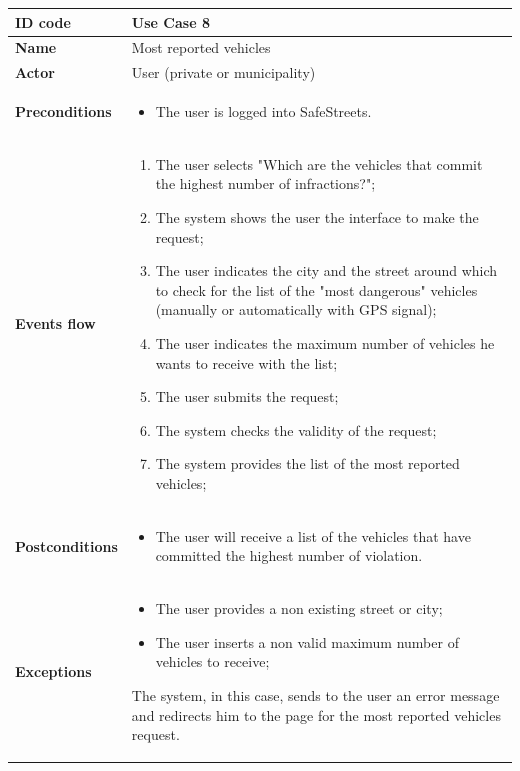 \documentclass[titlepage]{article}
\begin{document}
\newpage

\begin{longtable}{| p{3 cm} | p{10 cm} |} 
\hline


\textbf{ID code}  & Use Case 8 \\ \hline
\textbf{Name} & Most reported vehicles \\ \hline
\textbf{Actor} & User (private or municipality) \\ \hline
\textbf{Preconditions}  &
\begin{itemize}
\item The user is logged into SafeStreets.
\end{itemize} \\ \hline

\textbf{Events flow} &
\begin{enumerate}
\item The user selects "Which are the vehicles that commit the highest number of infractions?";
\item The system shows the user the interface to make the request;
\item The user indicates the city and the street around which to check for the list of the "most dangerous" vehicles (manually or automatically with GPS signal);
\item The user indicates the maximum number of vehicles he wants to receive with the list;
\item The user submits the request;
\item The system checks the validity of the request;
\item The system provides the list of the most reported vehicles;


\end{enumerate} \\ \hline

\textbf{Postconditions} & 
\begin{itemize}
\item The user will receive a list of the vehicles that have committed the highest number of violation.
\end{itemize} \\ \hline

\textbf{Exceptions} &
\begin{itemize}
\item The user provides a non existing street or city;
\item The user inserts a non valid maximum number of vehicles to receive;
\end{itemize}
The system, in this case, sends to the user an error message and redirects him to the page for the most reported vehicles request. \\ \hline


\end{longtable}
\end{document}
